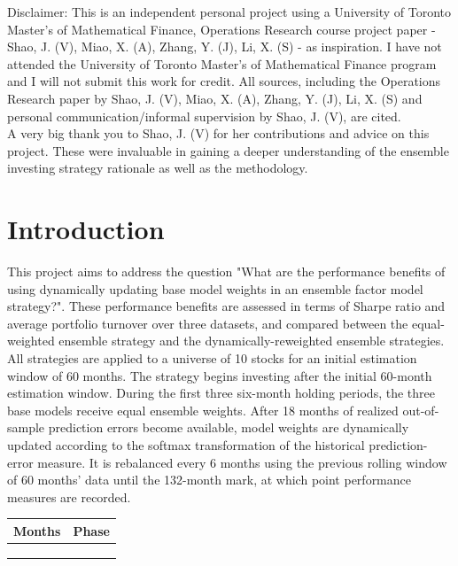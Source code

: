\documentclass{article}
\begin{document}
Disclaimer: This is an independent personal project using a University of Toronto Master's of Mathematical Finance, Operations Research course project paper - Shao, J. (V), Miao, X. (A), Zhang, Y. (J), Li, X. (S) -  as inspiration. I have not attended the University of Toronto Master's of Mathematical Finance program and I will not submit this work for credit. All sources, including the Operations Research paper by Shao, J. (V), Miao, X. (A), Zhang, Y. (J), Li, X. (S) and personal communication/informal supervision by Shao, J. (V), are cited.\\

A very big thank you to Shao, J. (V) for her contributions and advice on this project. These were invaluable in gaining a deeper understanding of the ensemble investing strategy rationale as well as the methodology.\\

\break

\section{Introduction}
This project aims to address the question "What are the performance benefits of using dynamically updating base model weights in an ensemble factor model strategy?". These performance benefits are assessed in terms of Sharpe ratio and average portfolio turnover over three datasets, and compared between the equal-weighted ensemble strategy and the dynamically-reweighted ensemble strategies. \\

All strategies are applied to a universe of 10 stocks for an initial estimation window of 60 months. The strategy begins investing after the initial 60-month estimation window. During the first three six-month holding periods, the three base models receive equal ensemble weights. After 18 months of realized out-of-sample prediction errors become available, model weights are dynamically updated according to the softmax transformation of the historical prediction-error measure. It is rebalanced every 6 months using the previous rolling window of 60 months' data until the 132-month mark, at which point performance measures are recorded.\\

\vspace{5mm}

\begin{tabular}{|L|L|}
\hline
\textbf{Months} & \textbf{Phase}\\
\hline
{} & \\
\hline
{} & \\
\hline
{} & \\
\hline
\end{tabular}
\end{document}
